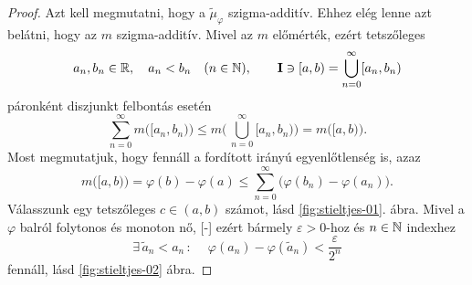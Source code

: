 \documentclass[
]{elteikthesis}[2024/04/26]
\begin{document}
\begin{proof}
		
		\newpage
		\Backifstep
		Azt kell megmutatni, hogy a \( \widetilde{\mu}_\varphi \) szigma-additív.
		Ehhez elég lenne azt belátni, hogy az \( m \) szigma-additív.
		Mivel az \( m \) előmérték, ezért tetszőleges
		\[
			a_n, b_n \in \mathbb{R}, \quad a_n < b_n \quad (n \in \mathbb{N}), \qquad 
			\mathbf{I} \ni [a, b) = \bigcup_{n = 0}^{\infty} [a_n, b_n)
		\]
		páronként diszjunkt felbontás esetén
		\[
			\sum_{n=0}^{\infty} m \bigl( [a_n, b_n) \bigr) \leq
			m \Biggl( \, \bigcup_{n = 0}^{\infty} [a_n, b_n) \Biggr) =
			m \bigl( [a, b) \bigr).
		\]
		Most megmutatjuk, hogy fennáll a fordított irányú egyenlőtlenség is, azaz
		\[
			m \bigl( [a, b) \bigr) = 
			\varphi(b) - \varphi(a) \leq
			\sum_{n=0}^{\infty} \bigl( \varphi(b_n) - \varphi(a_n) \bigr).
		\]
		Válasszunk egy tetszőleges \( c \in (a,b) \) számot, lásd \ref{fig:stieltjes-01}. ábra.
		Mivel a \( \varphi \) balról folytonos és monoton nő,
		[-\baselineskip]
		ezért bármely \( \varepsilon > 0 \)-hoz és \( n \in \mathbb{N} \) indexhez
		\begin{equation}\label{eq:stieltjes-02}
			\exists \,\widetilde{a}_n < a_n \, \colon \ \quad
			\varphi( a_n ) - \varphi( \widetilde{a}_n ) < \frac{\varepsilon}{2^n}
			\tag{\( ** \)}
		\end{equation}
		fennáll, lásd \ref{fig:stieltjes-02} ábra.
\end{proof}
\end{document}
